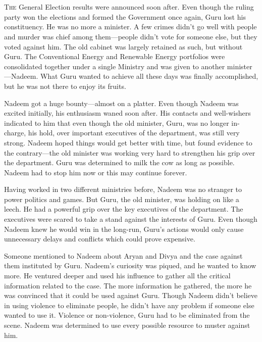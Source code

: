 \chapter{}

\lettrine{T}{he} General Election results were announced soon after. Even though
the ruling party won the elections and formed the Government once again, Guru
lost his constituency. He was no more a minister. A few crimes didn't go well
with people and murder was chief among them—people didn't vote for someone else,
but they voted against him. The old cabinet was largely retained as such, but
without Guru. The Conventional Energy and Renewable Energy portfolios were
consolidated together under a single Ministry and was given to another
minister—Nadeem. What Guru wanted to achieve all these days was finally
accomplished, but he was not there to enjoy its fruits.

Nadeem got a huge bounty—almost on a platter. Even though Nadeem was excited
initially, his enthusiasm waned soon after. His contacts and well-wishers
indicated to him that even though the old minister, Guru, was no longer
in-charge, his hold, over important executives of the department, was still very
strong. Nadeem hoped things would get better with time, but found evidence to
the contrary—the old minister was working very hard to strengthen his grip
over the department. Guru was determined to milk the cow as long as possible.
Nadeem had to stop him now or this may continue forever.

Having worked in two different ministries before, Nadeem was no stranger to
power politics and games. But Guru, the old minister, was holding on like a
leech. He had a powerful grip over the key executives of the department. The
executives were scared to take a stand against the interests of Guru. Even
though Nadeem knew he would win in the long-run, Guru's actions would only cause
unnecessary delays and conflicts which could prove expensive.

Someone mentioned to Nadeem about Aryan and Divya and the case against them
instituted by Guru. Nadeem's curiosity was piqued, and he wanted to know more. He
ventured deeper and used his influence to gather all the critical information
related to the case. The more information he gathered, the more he was convinced
that it could be used against Guru. Though Nadeem didn't believe in using
violence to eliminate people, he didn't have any problem if someone else wanted
to use it. Violence or non-violence, Guru had to be eliminated from the scene.
Nadeem was determined to use every possible resource to muster against him.

